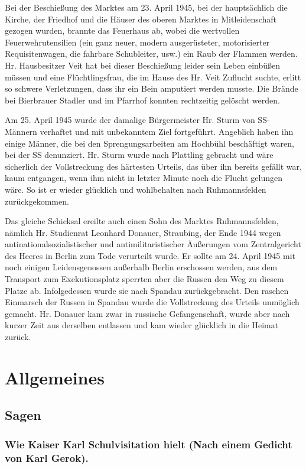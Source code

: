 \documentclass[12pt,a4paper]{book}
\begin{document}
Bei der Beschießung des Marktes am 23. April 1945, bei der hauptsächlich
die Kirche, der Friedhof und die Häuser des oberen Marktes in
Mitleidenschaft gezogen wurden, brannte das Feuerhaus ab, wobei die
wertvollen Feuerwehrutensilien (ein ganz neuer, modern ausgerüsteter,
motorisierter Requisitenwagen, die fahrbare Schubleiter, usw.) ein Raub
der Flammen werden. Hr. Hausbesitzer Veit hat bei dieser Beschießung
leider sein Leben einbüßen müssen und eine Flüchtlingsfrau, die im Hause
des Hr. Veit Zuflucht suchte, erlitt so schwere Verletzungen, dass ihr
ein Bein amputiert werden musste. Die Brände bei Bierbrauer Stadler und
im Pfarrhof konnten rechtzeitig gelöscht werden.

Am 25. April 1945 wurde der damalige Bürgermeister Hr. Sturm von SS-
Männern verhaftet und mit unbekanntem Ziel fortgeführt. Angeblich haben
ihn einige Männer, die bei den Sprengungsarbeiten am Hochbühl
beschäftigt waren, bei der SS denunziert. Hr. Sturm wurde nach Plattling
gebracht und wäre sicherlich der Vollstreckung des härtesten Urteils,
das über ihn bereits gefällt war, kaum entgangen, wenn ihm nicht in
letzter Minute noch die Flucht gelungen wäre. So ist er wieder glücklich
und wohlbehalten nach Ruhmannsfelden zurückgekommen.

Das gleiche Schicksal ereilte auch einen Sohn des Marktes
Ruhmannsfelden, nämlich Hr. Studienrat Leonhard Donauer, Straubing, der
Ende 1944 wegen antinationalsozialistischer und antimilitaristischer
Äußerungen vom Zentralgericht des Heeres in Berlin zum Tode verurteilt
wurde. Er sollte am 24. April 1945 mit noch einigen Leidensgenossen
außerhalb Berlin erschossen werden, aus dem Transport zum
Exekutionsplatz sperrten aber die Russen den Weg zu diesem Platze ab.
Infolgedessen wurde sie nach Spandau zurückgebracht. Den raschen
Einmarsch der Russen in Spandau wurde die Vollstreckung des Urteils
unmöglich gemacht. Hr. Donauer kam zwar in russische Gefangenschaft,
wurde aber nach kurzer Zeit aus derselben entlassen und kam wieder
glücklich in die Heimat zurück.

\part{Allgemeines}

\chapter{Sagen}

\section{Wie Kaiser Karl Schulvisitation hielt (Nach einem Gedicht von
Karl Gerok).}
\end{document}
